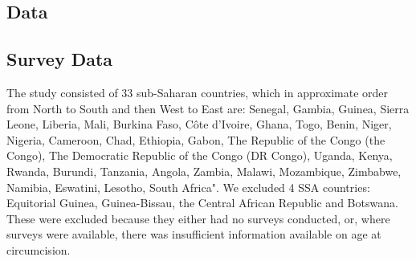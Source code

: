 \documentclass{article}
\begin{document}
\begin{appendix}


\newpage

\tableofcontents

\newpage


\section{Data}
\label{sec:org8802288}


\subsection{Survey Data}
\label{sec:org09db5e8}


The study consisted of 33 sub-Saharan countries, which in approximate order from North to South and then West to East are: Senegal, Gambia, Guinea, Sierra Leone, Liberia, Mali, Burkina Faso, Côte d’Ivoire, Ghana, Togo, Benin, Niger, Nigeria, Cameroon, Chad, Ethiopia, Gabon, The Republic of the Congo (the Congo), The Democratic Republic of the Congo (DR Congo), Uganda, Kenya, Rwanda, Burundi, Tanzania, Angola, Zambia, Malawi, Mozambique, Zimbabwe, Namibia, Eswatini, Lesotho, South Africa". 
We excluded 4 SSA countries: Equitorial Guinea, Guinea-Bissau, the Central African Republic and Botswana. These were excluded because they either had no surveys conducted, or, where surveys were available, there was insufficient information available on age at circumcision.  


\end{appendix}
\end{document}
